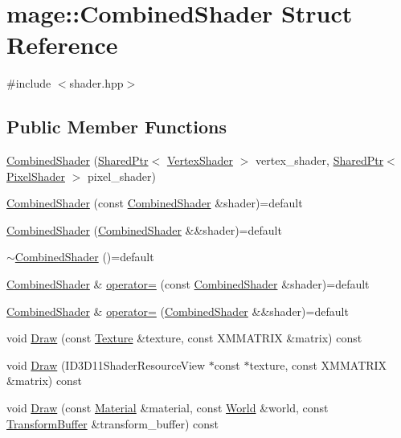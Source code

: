 \hypertarget{structmage_1_1_combined_shader}{}\section{mage\+:\+:Combined\+Shader Struct Reference}
\label{structmage_1_1_combined_shader}


{\ttfamily \#include $<$shader.\+hpp$>$}

\subsection*{Public Member Functions}
\begin{DoxyCompactItemize}
\item 
\hyperlink{structmage_1_1_combined_shader_ab9d6ce4dc9ed2602b19729ee8d126f61}{Combined\+Shader} (\hyperlink{namespacemage_a1e01ae66713838a7a67d30e44c67703e}{Shared\+Ptr}$<$ \hyperlink{classmage_1_1_vertex_shader}{Vertex\+Shader} $>$ vertex\+\_\+shader, \hyperlink{namespacemage_a1e01ae66713838a7a67d30e44c67703e}{Shared\+Ptr}$<$ \hyperlink{classmage_1_1_pixel_shader}{Pixel\+Shader} $>$ pixel\+\_\+shader)
\item 
\hyperlink{structmage_1_1_combined_shader_afc4a237b78efe6b13d6e569ede301b62}{Combined\+Shader} (const \hyperlink{structmage_1_1_combined_shader}{Combined\+Shader} \&shader)=default
\item 
\hyperlink{structmage_1_1_combined_shader_a74c1a44f6b1ec3cc1734b18b337441d3}{Combined\+Shader} (\hyperlink{structmage_1_1_combined_shader}{Combined\+Shader} \&\&shader)=default
\item 
\hyperlink{structmage_1_1_combined_shader_a6b1767d2525724f2f9120df87253973e}{$\sim$\+Combined\+Shader} ()=default
\item 
\hyperlink{structmage_1_1_combined_shader}{Combined\+Shader} \& \hyperlink{structmage_1_1_combined_shader_a14859fb597c07309fd269b56af373c02}{operator=} (const \hyperlink{structmage_1_1_combined_shader}{Combined\+Shader} \&shader)=default
\item 
\hyperlink{structmage_1_1_combined_shader}{Combined\+Shader} \& \hyperlink{structmage_1_1_combined_shader_ad05cf0e2c4f0cd7d37ad5be971aefd1b}{operator=} (\hyperlink{structmage_1_1_combined_shader}{Combined\+Shader} \&\&shader)=default
\item 
void \hyperlink{structmage_1_1_combined_shader_a46cc51271ab3676ab57452037f367a93}{Draw} (const \hyperlink{classmage_1_1_texture}{Texture} \&texture, const X\+M\+M\+A\+T\+R\+IX \&matrix) const
\item 
void \hyperlink{structmage_1_1_combined_shader_ad1fba7349714e62c7b1215b8928fddd3}{Draw} (I\+D3\+D11\+Shader\+Resource\+View $\ast$const $\ast$texture, const X\+M\+M\+A\+T\+R\+IX \&matrix) const
\item 
void \hyperlink{structmage_1_1_combined_shader_a9495f851c713c2d43c2eecf5aced3d9f}{Draw} (const \hyperlink{structmage_1_1_material}{Material} \&material, const \hyperlink{classmage_1_1_world}{World} \&world, const \hyperlink{structmage_1_1_transform_buffer}{Transform\+Buffer} \&transform\+\_\+buffer) const
\end{DoxyCompactItemize}
